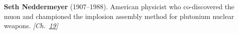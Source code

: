 \textbf{Seth Neddermeyer} (1907–1988). American physicist who co-discovered the muon and championed the implosion assembly method for plutonium nuclear weapons. \emph{[Ch.~\hyperref[ch:cosmicraymuons]{19}]}

